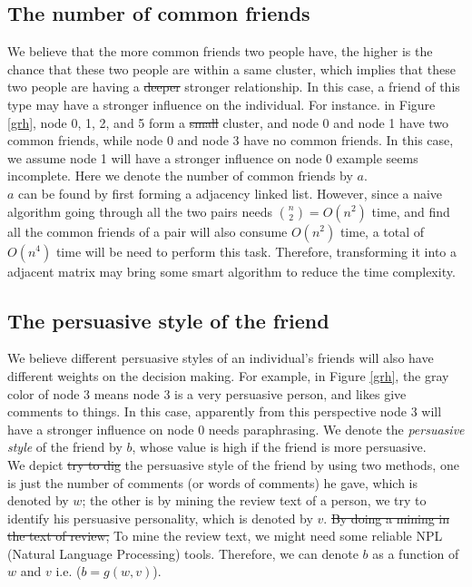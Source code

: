 \documentclass[11pt]{article} %
\newcommand{\1}{{\bf 1}}
\newcommand{\0}{{\bf 0}}
\begin{document}
\subsection{The number of common friends}
We believe that the more common friends two people have, the higher is the chance that these two people are within a same cluster, which implies that these two people are having a \sout{deeper} stronger relationship. In this case, a friend of this type may have a stronger influence on the individual. For instance. in Figure \ref{grh}, node 0, 1, 2, and 5 form a \sout{small} cluster, and node 0 and node 1 have two common friends, while node 0 and node 3 have no common friends. In this case, we assume node 1 will have a stronger influence on node 0 {\color{red} example seems incomplete}. Here we denote the number of common friends by $ a $.\\

$ a $ can be found by first forming a adjacency linked list. However, since a naive algorithm going through all the two pairs needs $ \binom{n}{2}=O(n^{2}) $ time, and find all the common friends of a pair will also consume $ O(n^{2}) $ time, a total of $ O(n^{4}) $ time will be need to perform this task. Therefore, transforming it into a adjacent matrix may bring some smart algorithm to reduce the time complexity.

\subsection{The persuasive style of the friend}
We believe different persuasive styles of an individual's friends will also have different weights on the decision making. For example, in Figure	\ref{grh}, the gray color of node 3 means node 3 is a very persuasive person, and likes give comments to things. In this case, apparently from this perspective node 3 will have a stronger influence on node 0 {\color{red} needs paraphrasing}. We denote the \textit{persuasive style} of the friend by $ b $, whose value is high if the friend is more persuasive.\\

We depict \sout{try to dig} the persuasive style of the friend by using two methods, one is just the number of comments (or words of comments) he gave, which is denoted by $ w $; the other is by mining the review text of a person, we try to identify his persuasive personality, which is denoted by $ v $. \sout{By doing a mining in the text of review,} To mine the review text, we might need some reliable NPL (Natural Language Processing) tools. Therefore, we can denote $ b $ as a function of $ w $ and $ v $ i.e. ($ b=g(w,v) $).
\end{document}
